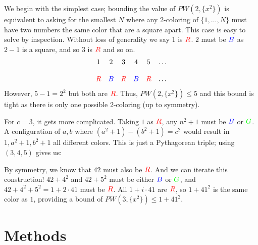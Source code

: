 \documentclass[a4paper]{amsproc}
\theoremstyle{plain}
\newcommand{\RR} {\color{red} R}
\newcommand{\BB} {\color{blue} B}
\newcommand{\GG} {\color{green} G}
\begin{document}
We begin with the simplest case; bounding the value of $PW(2,\{x^2\})$ is equivalent to asking for the smallest $N$ where any $2$-coloring of $\{1,\ldots,N\}$ must have two numbers the same color that are a square apart.
This case is easy to solve by inspection.
Without loss of generality we say $1$ is $\RR$.
$2$ must be $\BB$ as $2-1$ is a square, and so $3$ is $\RR$ and so on.
\[\begin{matrix}1&2&3&4&5&\ldots\\\\\RR&\BB&\RR&\BB&\RR&\ldots\end{matrix}\]
However, $5-1=2^2$ but both are $\RR$.
Thus, $PW(2,\{x^2\})\leq 5$ and this bound is tight as there is only one possible $2$-coloring (up to symmetry).

For $c=3$, it gets more complicated.
Taking $1$ as $\RR$, any $n^2+1$ must be $\BB$ or $\GG$.
A configuration of $a,b$ where $(a^2+1)-(b^2+1)=c^2$ would result in $1, a^2+1, b^2+1$ all different colors.
This is just a Pythagorean triple; using $(3,4,5)$ gives us:

\begin{figure}[htb]
\end{figure}

By symmetry, we know that 42 must also be $\RR$.
And we can iterate this construction! $42+4^2$ and $42+5^2$ must be either $\BB$ or $\GG$, and $42+4^2+5^2=1+2\cdot41$ must be $\RR$.
All $1+i\cdot41$ are $\RR$, so $1+41^2$ is the same color as $1$, providing a bound of $PW(3, \{x^2\})\leq 1+41^2$.

\section{Methods}
\end{document}
